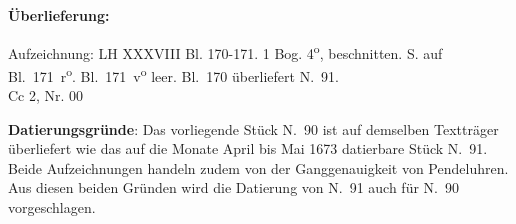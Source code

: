       
               
                \begin{ledgroupsized}[r]{120mm}
                \footnotesize 
                \pstart                
                \noindent\textbf{\"{U}berlieferung:}   
                \pend
                \end{ledgroupsized}
            
              
                             \begin{ledgroupsized}[r]{114mm}
                            \footnotesize 
                            \pstart \parindent -6mm
                            Aufzeichnung: LH XXXVIII Bl. 170-171.
1 Bog. 4\textsuperscript{o}, beschnitten.
 S. auf Bl.~171~r\textsuperscript{o}.
Bl.~171~v\textsuperscript{o} leer.
Bl.~170 überliefert N.~91.%
 \\Cc 2, Nr. 00 \pend
                            \end{ledgroupsized}
                \vspace*{5mm}
                \begin{ledgroup}
                \footnotesize 
                \pstart
            \noindent\footnotesize{\textbf{Datierungsgr\"{u}nde}: Das vorliegende St\"{u}ck N.~90 ist auf demselben Textträger überliefert wie das auf die Monate April bis Mai 1673 datierbare Stück N.~91.
Beide Aufzeichnungen handeln zudem von der Ganggenauigkeit von Pendeluhren.
Aus diesen beiden Gründen wird die Datierung von N.~91 %
auch für N.~90 %
vorgeschlagen.}
                \pend
                \end{ledgroup}
            
